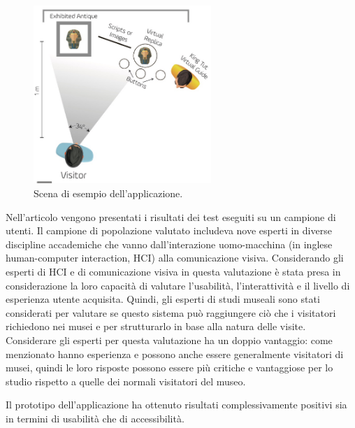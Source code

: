 \begin{figure}[t]
    \centering
    \includegraphics[width=0.6\textwidth]{images/museum.png}
    \caption{Scena di esempio dell'applicazione.}
    \label{fig:figure33}
\end{figure}

Nell'articolo vengono presentati i risultati dei test eseguiti su un campione di utenti.
Il campione di popolazione valutato includeva nove esperti in diverse discipline accademiche che vanno dall'interazione uomo-macchina (in inglese human-computer interaction, HCI) alla comunicazione visiva. Considerando gli esperti di HCI e di comunicazione visiva in questa valutazione è stata presa in considerazione la loro capacità di valutare l'usabilità, l'interattività e il livello di esperienza utente acquisita. Quindi, gli esperti di studi museali sono stati considerati per valutare se questo sistema può raggiungere ciò che i visitatori richiedono nei musei e per strutturarlo in base alla natura delle visite. Considerare gli esperti per questa valutazione ha un doppio vantaggio: come menzionato hanno esperienza e possono anche essere generalmente visitatori di musei, quindi le loro risposte possono essere più critiche e vantaggiose per lo studio rispetto a quelle  dei normali visitatori del museo.

Il prototipo dell'applicazione ha ottenuto risultati complessivamente positivi sia in termini di usabilità che di accessibilità.